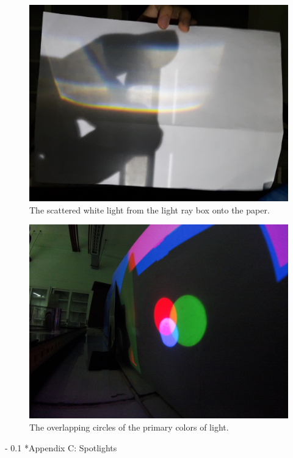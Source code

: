\documentclass[twoside]{article}
\makeatletter
\renewcommand\section{\@startsection
   {section}{1}{0pt}%
   {-\baselineskip}%
   {0.1\baselineskip}%
   {\normalfont\large\bfseries}}%
\makeatother
\begin{document}
\captionsetup[figure]{width=5in}
\begin{figure}[h!]
\centering
\includegraphics[scale=0.1]{20160922_145952}
\caption{The scattered white light from the light ray box onto the paper.}
\label{fig:phasediff}
\end{figure}

\captionsetup[figure]{width=5in}
\begin{figure}[h!]
\centering
\includegraphics[scale=0.07]{venn}
\caption{The overlapping circles of the primary colors of light.}
\label{fig:phasediff}
\end{figure}


\newpage
\section*{Appendix C: Spotlights}
\label{sec:appendixA}
\end{document}
